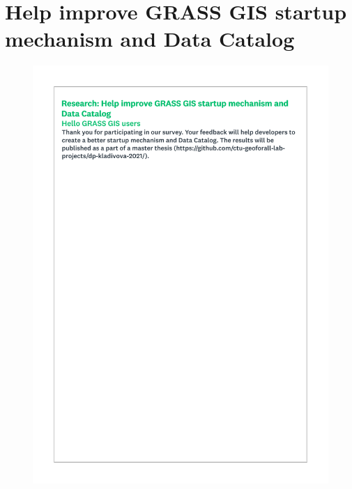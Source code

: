 \documentclass[a4paper,10pt,twoside]{article}
\begin{document}
\newpage
\vspace*{-6ex}
\renewcommand{\refname}{References} 
	
	

\noindent
\large

\newpage
\vspace*{-1cm}
\appendix
\section{Help improve GRASS GIS startup mechanism and Data Catalog }
\label{appendix:A}
\setcounter{page}{1} 
 
 \begin{figure}[hbt!]
 \begin{center}
 \includegraphics[width=12.5cm]{../surveys/questionnaires/survey1_part1_page1_intro.pdf}
 \end{center}
 \end{figure}
 
\end{document}
